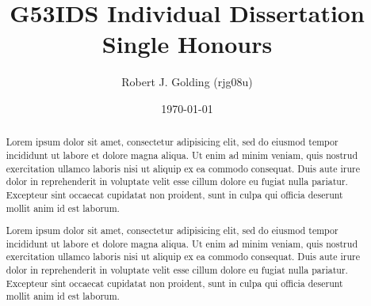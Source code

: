 \documentclass[a4paper,11pt]{article}
\title{
    \vspace{1cm}
    G53IDS Individual Dissertation Single Honours
}
\author{Robert J. Golding (rjg08u)} \date{\today}
\begin{document}
    \maketitle
    \thispagestyle{empty}

    \begin{abstract}

        Lorem ipsum dolor sit amet, consectetur adipisicing elit, sed do
        eiusmod tempor incididunt ut labore et dolore magna aliqua. Ut enim ad
        minim veniam, quis nostrud exercitation ullamco laboris nisi ut aliquip
        ex ea commodo consequat. Duis aute irure dolor in reprehenderit in
        voluptate velit esse cillum dolore eu fugiat nulla pariatur. Excepteur
        sint occaecat cupidatat non proident, sunt in culpa qui officia
        deserunt mollit anim id est laborum.

        Lorem ipsum dolor sit amet, consectetur adipisicing elit, sed do
        eiusmod tempor incididunt ut labore et dolore magna aliqua. Ut enim ad
        minim veniam, quis nostrud exercitation ullamco laboris nisi ut aliquip
        ex ea commodo consequat. Duis aute irure dolor in reprehenderit in
        voluptate velit esse cillum dolore eu fugiat nulla pariatur. Excepteur
        sint occaecat cupidatat non proident, sunt in culpa qui officia
        deserunt mollit anim id est laborum.

    \end{abstract}

    \newpage
    \tableofcontents
    \newpage

    

    

    \newpage
    

    \newpage
    

    \newpage
    

    \newpage
    \nocite{*}
    
    
\end{document}
